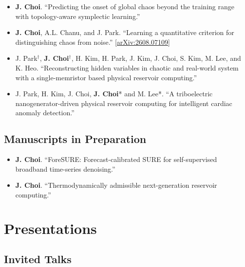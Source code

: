 \documentclass[11pt,a4paper]{article}
\begin{document}
\begin{itemize}[leftmargin=1.5em, topsep=0.2em, itemsep=0.2em]
    \item \textbf{J. Choi}. ``Predicting the onset of global chaos beyond the training range with topology-aware symplectic learning.''

    \item \textbf{J. Choi}, A.L. Chanu, and J. Park. ``Learning a quantitative criterion for distinguishing chaos from noise.'' \href{https://arxiv.org/abs/2608.07109}{[arXiv:2608.07109]}
    
    \item J. Park$^\dagger$, \textbf{J. Choi}$^\dagger$, H. Kim, H. Park, J. Kim, J. Choi, S. Kim, M. Lee, and K. Heo. ``Reconstructing hidden variables in chaotic and real-world system with a single-memristor based physical reservoir computing.''

    \item J. Park, H. Kim, J. Choi, \textbf{J. Choi}* and M. Lee*. ``A triboelectric nanogenerator-driven physical reservoir computing for intelligent cardiac anomaly detection.''

\end{itemize}

\subsection*{Manuscripts in Preparation}

\begin{itemize}[leftmargin=1.5em, topsep=0.2em, itemsep=0.2em]
    \item \textbf{J. Choi}. ``ForeSURE: Forecast-calibrated SURE for self-supervised broadband time-series denoising.''
    \item \textbf{J. Choi}. ``Thermodynamically admissible next-generation reservoir computing.''
\end{itemize}

\section*{Presentations}

\subsection*{Invited Talks}
\end{document}
